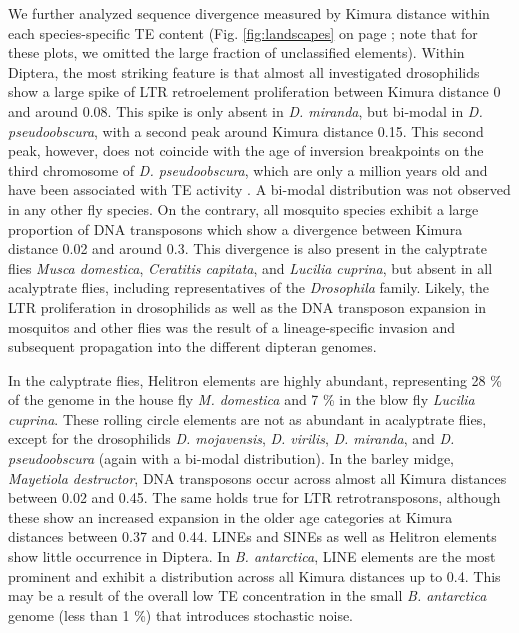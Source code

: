 We further analyzed sequence divergence measured by Kimura distance
within each species-specific TE content (Fig. \ref{fig:landscapes} on
page \pageref{fig:landscapes}; note that for these plots, we omitted the
large fraction of unclassified elements). Within Diptera, the most
striking feature is that almost all investigated drosophilids show a
large spike of LTR retroelement proliferation between Kimura distance 0
and around 0.08. This spike is only absent in \emph{D. miranda}, but
bi-modal in \emph{D. pseudoobscura}, with a second peak around Kimura
distance 0.15. This second peak, however, does not coincide with the age
of inversion breakpoints on the third chromosome of \emph{D.
pseudoobscura}, which are only a million years old and have been
associated with TE activity \citep{Wallace2011}. A bi-modal distribution
was not observed in any other fly species. On the contrary, all mosquito
species exhibit a large proportion of DNA transposons which show a
divergence between Kimura distance 0.02 and around 0.3. This divergence
is also present in the calyptrate flies \emph{Musca domestica},
\emph{Ceratitis capitata}, and \emph{Lucilia cuprina}, but absent in all
acalyptrate flies, including representatives of the \emph{Drosophila}
family. Likely, the LTR proliferation in drosophilids as well as the DNA
transposon expansion in mosquitos and other flies was the result of a
lineage-specific invasion and subsequent propagation into the different
dipteran genomes.



In the calyptrate flies, Helitron elements are highly abundant,
representing 28 \% of the genome in the house fly \emph{M. domestica}
and 7 \% in the blow fly \emph{Lucilia cuprina}. These rolling circle
elements are not as abundant in acalyptrate flies, except for the
drosophilids \emph{D. mojavensis}, \emph{D. virilis}, \emph{D. miranda},
and \emph{D. pseudoobscura} (again with a bi-modal distribution). In the
barley midge, \emph{Mayetiola destructor}, DNA transposons occur across
almost all Kimura distances between 0.02 and 0.45. The same holds true
for LTR retrotransposons, although these show an increased expansion in
the older age categories at Kimura distances between 0.37 and 0.44.
LINEs and SINEs as well as Helitron elements show little occurrence in
Diptera. In \emph{B. antarctica}, LINE elements are the most prominent
and exhibit a distribution across all Kimura distances up to 0.4. This
may be a result of the overall low TE concentration in the small
\emph{B. antarctica} genome (less than 1 \%) that introduces stochastic
noise.


